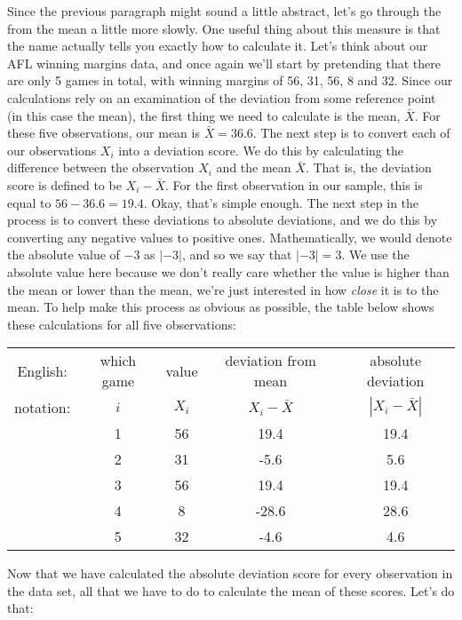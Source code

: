 Since the previous paragraph might sound a little abstract, let's go through the  from the mean a little more slowly. One useful thing about this measure is that the name actually tells you exactly how to calculate it. Let's think about our AFL winning margins data, and once again we'll start by pretending that there are only 5 games in total, with winning margins of 56, 31, 56, 8 and 32. Since our calculations rely on an examination of the deviation from some reference point (in this case the mean), the first thing we need to calculate is the mean, $\bar{X}$. For these five observations, our mean is $\bar{X} = 36.6$. The next step is to convert each of our observations $X_i$ into a deviation score. We do this by calculating the difference between the observation $X_i$ and the mean $\bar{X}$. That is, the deviation score is defined to be $X_i - \bar{X}$. For the first observation in our sample, this is equal to $56 - 36.6 = 19.4$. Okay, that's simple enough. The next step in the process is to convert these deviations to absolute deviations, and we do this by converting any negative values to positive ones. Mathematically, we would denote the absolute value of $-3$ as $|-3|$, and so we say that $|-3| = 3$. We use the absolute value here because we don't really care whether the value is higher than the mean or lower than the mean, we're just interested in how {\it close} it is to the mean. To help make this process as obvious as possible, the table below shows these calculations for all five observations:

\vspace{0.5cm}
\begin{center}
\begin{tabular}{ccccc} 
English: & which game & value & deviation from mean & absolute deviation \\
notation: & $i$ & $X_i$ & $X_i - \bar{X}$ &  $|X_i - \bar{X}|$ \\ \hline
& 1 & 56 & 19.4  & 19.4\\
& 2 & 31 &  -5.6 & 5.6\\ 
& 3 & 56 & 19.4  & 19.4\\
& 4 & 8 & -28.6  & 28.6\\
& 5 & 32 & -4.6  & 4.6 \\
\end{tabular}
\end{center}

\noindent
Now that we have calculated the absolute deviation score for every observation in the data set, all that we have to do to calculate the mean of these scores. Let's do that:

